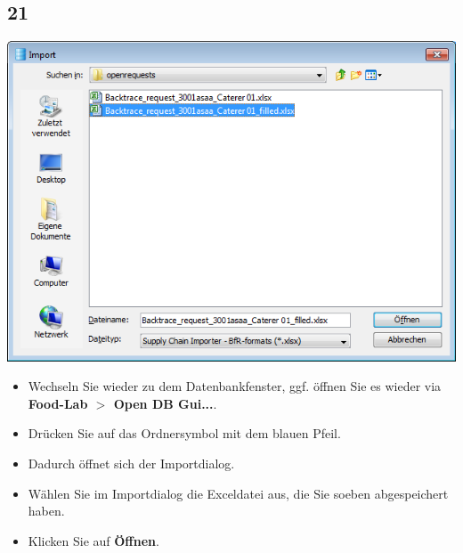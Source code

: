 \documentclass{beamer}
\begin{document}
\subsection{21}
\begin{frame}
	\begin{center}
  		\includegraphics[height=0.6\textheight]{21.png}
	\end{center}
	\begin{itemize}
		\item Wechseln Sie wieder zu dem Datenbankfenster, ggf. öffnen Sie es wieder via \textbf{Food-Lab $>$ Open DB Gui...}.
		\item Drücken Sie auf das Ordnersymbol mit dem blauen Pfeil.
		\item Dadurch öffnet sich der Importdialog.
		\item Wählen Sie im Importdialog die Exceldatei aus, die Sie soeben abgespeichert haben.
		\item Klicken Sie auf \textbf{Öffnen}.
	\end{itemize}
\end{frame}
\end{document}
